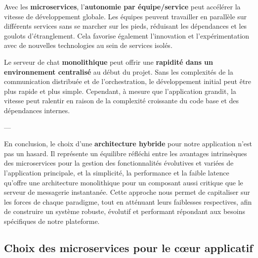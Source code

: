 \documentclass[12pt]{rapportPfe}
\begin{document}
Avec les \textbf{microservices}, l'\textbf{autonomie par équipe/service} peut accélérer la vitesse de développement globale. Les équipes peuvent travailler en parallèle sur différents services sans se marcher sur les pieds, réduisant les dépendances et les goulots d'étranglement. Cela favorise également l'innovation et l'expérimentation avec de nouvelles technologies au sein de services isolés.

Le serveur de chat \textbf{monolithique} peut offrir une \textbf{rapidité dans un environnement centralisé} au début du projet. Sans les complexités de la communication distribuée et de l'orchestration, le développement initial peut être plus rapide et plus simple. Cependant, à mesure que l'application grandit, la vitesse peut ralentir en raison de la complexité croissante du code base et des dépendances internes.

---

En conclusion, le choix d'une \textbf{architecture hybride} pour notre application n'est pas un hasard. Il représente un équilibre réfléchi entre les avantages intrinsèques des microservices pour la gestion des fonctionnalités évolutives et variées de l'application principale, et la simplicité, la performance et la faible latence qu'offre une architecture monolithique pour un composant aussi critique que le serveur de messagerie instantanée. Cette approche nous permet de capitaliser sur les forces de chaque paradigme, tout en atténuant leurs faiblesses respectives, afin de construire un système robuste, évolutif et performant répondant aux besoins spécifiques de notre plateforme.

\subsection{Choix des microservices pour le cœur applicatif}
\end{document}
